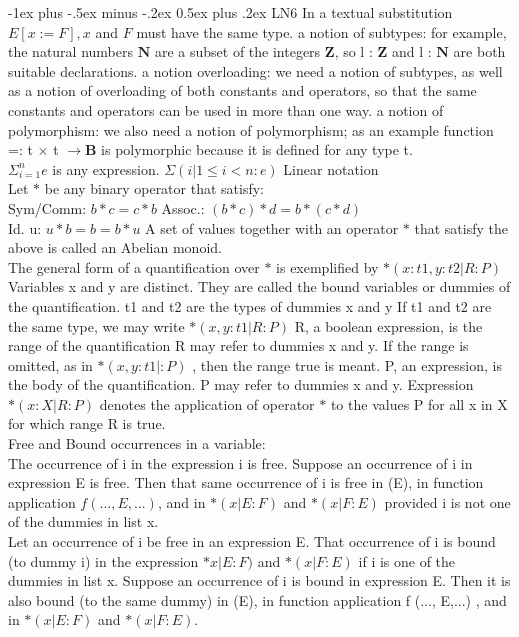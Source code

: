 \documentclass[letterpaper, 8pt]{extarticle}
\makeatletter
\renewcommand{\section}{\@startsection{section}{1}{0mm}%
                                {-1ex plus -.5ex minus -.2ex}%
                                {0.5ex plus .2ex}%
                                {\normalfont\normalsize\bfseries}}
\makeatother
\begin{document}
\begin{multicols*}{3}
    \section{LN6}
    In a textual substitution $E[x := F], x$ and $F$ must have the same type. a notion of subtypes: for example, the natural numbers $\mathbf{N}$ are a subset of the integers $\mathbf{Z}$, so l : $\mathbf{Z}$ and l : $\mathbf{N}$ are both suitable declarations. a notion overloading: we need a notion of subtypes, as well as a notion of overloading of both constants and operators, so that the same constants and operators can be used in more than one way. a notion of polymorphism: we also need a notion of
    polymorphism; as an example function =: t $\times$ t $\xrightarrow{} \mathbf{B}$ is polymorphic because it is defined for any type t.\\
    $\Sigma^{n}_{i=1} e$ is any expression. $\Sigma(i | 1 \leq i < n: e)$ Linear notation\\
    Let $*$ be any binary operator that satisfy:\\
    Sym/Comm: $b * c = c * b$ Assoc.: $(b * c) * d = b * (c * d)$\\
    Id. u: $u * b = b = b * u$ A set of values together with an operator $*$ that satisfy the above is called an Abelian monoid.\\
    The general form of a quantification over $*$ is exemplified by
    $*(x : t1, y : t2 | R : P )$ Variables x and y are distinct. They are called the bound variables or dummies of the quantification. t1 and t2 are the types of dummies x and y If t1 and t2 are the same type, we may write
    $*(x, y : t1 | R : P )$ R, a boolean expression, is the range of the quantification R may refer to dummies x and y. If the range is omitted, as in $*(x, y : t1 |: P )$ , then the range true is meant. P, an expression, is the body of the quantification. P may refer to dummies x and y. Expression $*(x : X | R : P )$ denotes the application of operator $*$ to the values P for all x in X for which range R is true.\\
    Free and Bound occurrences in a variable:\\
    The occurrence of i in the expression i is free. Suppose an occurrence of i in expression E is free. Then that same occurrence of i is free in (E), in function application $f (..., E,...)$, and in $*(x | E : F )$ and $*(x | F : E)$ provided i is not one of the dummies in list x.\\
    Let an occurrence of i be free in an expression E. That occurrence of i is bound (to dummy i) in the expression $*x | E : F )$ and $*(x | F : E )$ if i is one of the dummies in list x. Suppose an occurrence of i is bound in expression E. Then it is also bound (to the same dummy) in (E), in function application f (..., E,...) , and in $*(x | E : F )$ and $*(x | F : E )$.\\

\end{multicols*}
\end{document}

